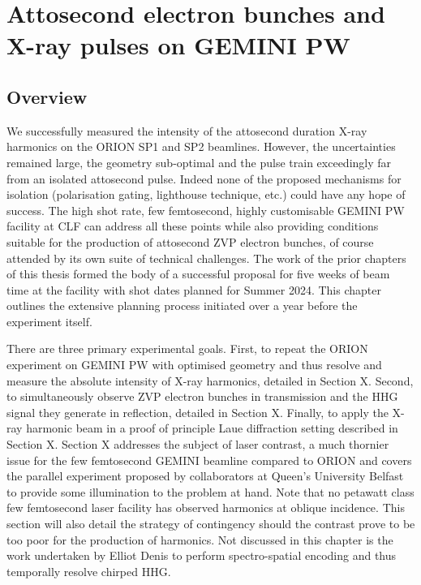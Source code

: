 \chapter{\label{ch:4-gemini}Attosecond electron bunches and X-ray pulses on GEMINI PW} 

\minitoc

\section{Overview}
We successfully measured the intensity of the attosecond duration X-ray harmonics on the ORION SP1 and SP2 beamlines. However, the uncertainties remained large, the geometry sub-optimal and the pulse train exceedingly far from an isolated attosecond pulse. Indeed none of the proposed mechanisms for isolation (polarisation gating, lighthouse technique, etc.) could have any hope of success. The high shot rate, few femtosecond, highly customisable GEMINI PW facility at CLF can address all these points while also providing conditions suitable for the production of attosecond ZVP electron bunches, of course attended by its own suite of technical challenges. The work of the prior chapters of this thesis formed the body of a successful proposal for five weeks of beam time at the facility with shot dates planned for Summer 2024. This chapter outlines the extensive planning process initiated over a year before the experiment itself.

There are three primary experimental goals. First, to repeat the ORION experiment on GEMINI PW with optimised geometry and thus resolve and measure the absolute intensity of X-ray harmonics, detailed in Section X. Second, to simultaneously observe ZVP electron bunches in transmission and the HHG signal they generate in reflection, detailed in Section X. Finally, to apply the X-ray harmonic beam in a proof of principle Laue diffraction setting described in Section X. Section X addresses the subject of laser contrast, a much thornier issue for the few femtosecond GEMINI beamline compared to ORION and covers the parallel experiment proposed by collaborators at Queen's University Belfast to provide some illumination to the problem at hand. Note that no petawatt class few femtosecond laser facility has observed harmonics at oblique incidence. This section will also detail the strategy of contingency should the contrast prove to be too poor for the production of harmonics. Not discussed in this chapter is the work undertaken by Elliot Denis to perform spectro-spatial encoding and thus temporally resolve chirped HHG.

